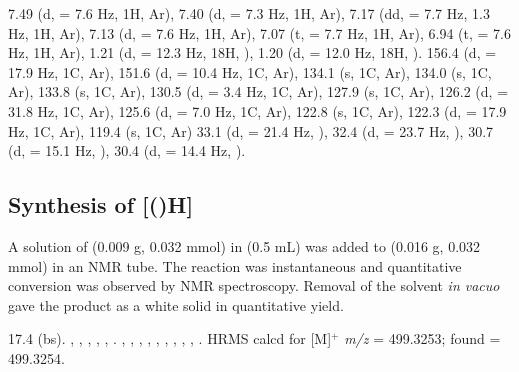7.49 (d, \J = 7.6 Hz, 1H, Ar),
7.40 (d, \J = 7.3 Hz, 1H, Ar),
7.17 (dd, \J = 7.7 Hz, 1.3 Hz, 1H, Ar),
7.13 (d, \J = 7.6 Hz, 1H, Ar),
7.07 (t, \J = 7.7 Hz, 1H, Ar),
6.94 (t, \J = 7.6 Hz, 1H, Ar),
1.21 (d, \J = 12.3 Hz, 18H, \StBuiH),
1.20 (d, \J = 12.0 Hz, 18H, \StBuiH).
156.4 (d, \JPC = 17.9 Hz, 1C, Ar),
151.6 (d, \JPC = 10.4 Hz, 1C, Ar),
134.1 (s, 1C, Ar),
134.0 (s, 1C, Ar),
133.8 (s, 1C, Ar),
130.5 (d, \JPC = 3.4 Hz, 1C, Ar),
127.9 (s, 1C, Ar),
126.2 (d, \JPC = 31.8 Hz, 1C, Ar),
125.6 (d, \JPC = 7.0 Hz, 1C, Ar),
122.8 (s, 1C, Ar),
122.3 (d, \JPC = 17.9 Hz, 1C, Ar),
119.4 (s, 1C, Ar)
33.1 (d, \JPC = 21.4 Hz, \StBuhC),
32.4 (d, \JPC = 23.7 Hz, \StBuhC),
30.7 (d, \JPC = 15.1 Hz, \StBuiC),
30.4 (d, \JPC = 14.4 Hz, \StBuiC).

\subsection*{Synthesis of \texorpdfstring{[(\tBuxantphos)H]} t}



A solution of  (0.009 g, 0.032 mmol) in  (0.5 mL) was added to \tBuxantphos{} (0.016 g, 0.032 mmol)  in an NMR tube.  The reaction was instantaneous and quantitative conversion was observed by NMR spectroscopy.  Removal of the solvent \emph{in vacuo} gave the product as a white solid in quantitative yield.  


17.4 (bs).
,
,
,
,
,
.
,
,
,
,
,
,
,
,
,
.
HRMS calcd for  [M]$^+$ \emph{m/z} = 499.3253; found = 499.3254.

